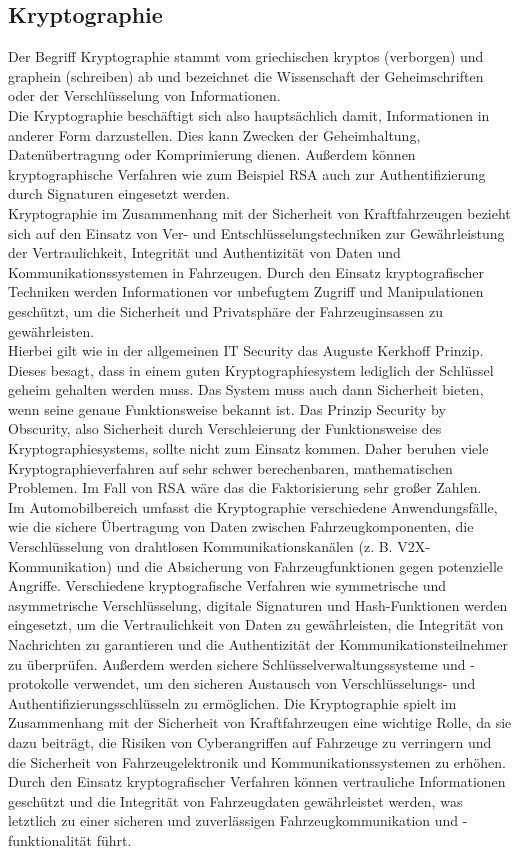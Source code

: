 \subsection{Kryptographie}
\glqq Der Begriff Kryptographie stammt vom griechischen kryptos (verborgen) und graphein (schreiben) ab und bezeichnet die Wissenschaft der Geheimschriften oder der Verschlüsselung von Informationen.
\grqq{} \cite[9]{Wurm.2022}\\
Die Kryptographie beschäftigt sich also hauptsächlich damit, Informationen in anderer Form darzustellen. Dies kann Zwecken der Geheimhaltung, Datenübertragung oder Komprimierung dienen. Außerdem können kryptographische Verfahren wie zum Beispiel RSA auch zur Authentifizierung durch Signaturen eingesetzt werden.\\
Kryptographie im Zusammenhang mit der Sicherheit von Kraftfahrzeugen bezieht sich auf den Einsatz von Ver- und Entschlüsselungstechniken zur Gewährleistung der Vertraulichkeit, Integrität und Authentizität von Daten und Kommunikationssystemen in Fahrzeugen. Durch den Einsatz kryptografischer Techniken werden Informationen vor unbefugtem Zugriff und Manipulationen geschützt, um die Sicherheit und Privatsphäre der Fahrzeuginsassen zu gewährleisten. \\
Hierbei gilt wie in der allgemeinen IT Security das Auguste Kerkhoff Prinzip. Dieses besagt, dass in einem guten Kryptographiesystem lediglich der Schlüssel geheim gehalten werden muss. Das System muss auch dann Sicherheit bieten, wenn seine genaue Funktionsweise bekannt ist. Das Prinzip \glqq Security by Obscurity\grqq , also Sicherheit durch Verschleierung der Funktionsweise des Kryptographiesystems, sollte nicht zum Einsatz kommen. Daher beruhen viele Kryptographieverfahren auf sehr schwer berechenbaren, mathematischen Problemen. Im Fall von RSA wäre das die Faktorisierung sehr großer Zahlen.\\
Im Automobilbereich umfasst die Kryptographie verschiedene Anwendungsfälle, wie die sichere Übertragung von Daten zwischen Fahrzeugkomponenten, die Verschlüsselung von drahtlosen Kommunikationskanälen (z. B. \acs{V2X}-Kommunikation) und die Absicherung von Fahrzeugfunktionen gegen potenzielle Angriffe.
Verschiedene kryptografische Verfahren wie symmetrische und asymmetrische Verschlüsselung, digitale Signaturen und Hash-Funktionen werden eingesetzt, um die Vertraulichkeit von Daten zu gewährleisten, die Integrität von Nachrichten zu garantieren und die Authentizität der Kommunikationsteilnehmer zu überprüfen. Außerdem werden sichere Schlüsselverwaltungssysteme und -protokolle verwendet, um den sicheren Austausch von Verschlüsselungs- und Authentifizierungsschlüsseln zu ermöglichen.
Die Kryptographie spielt im Zusammenhang mit der Sicherheit von Kraftfahrzeugen eine wichtige Rolle, da sie dazu beiträgt, die Risiken von Cyberangriffen auf Fahrzeuge zu verringern und die Sicherheit von Fahrzeugelektronik und Kommunikationssystemen zu erhöhen. Durch den Einsatz kryptografischer Verfahren können vertrauliche Informationen geschützt und die Integrität von Fahrzeugdaten gewährleistet werden, was letztlich zu einer sicheren und zuverlässigen Fahrzeugkommunikation und -funktionalität führt.

